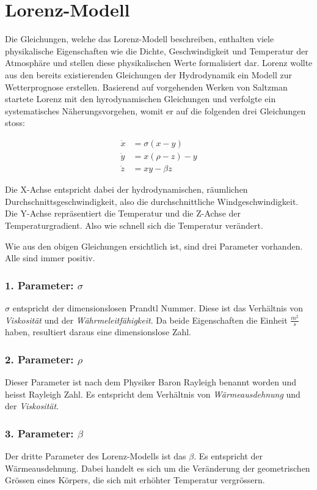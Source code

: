 

\section{Lorenz-Modell}
Die Gleichungen, welche das Lorenz-Modell beschreiben, enthalten viele physikalische Eigenschaften wie die Dichte, Geschwindigkeit und Temperatur der Atmosphäre und stellen diese physikalischen Werte formalisiert dar. Lorenz wollte aus den bereits existierenden Gleichungen der Hydrodynamik ein Modell zur Wetterprognose erstellen. Basierend auf vorgehenden Werken von Saltzman startete Lorenz mit den hyrodynamischen Gleichungen und verfolgte ein systematisches Näherungsvorgehen, womit er auf die folgenden drei Gleichungen stoss:

\begin{align}
\dot{x} &= \sigma(x - y)\\
\dot{y} &= x(\rho - z) - y\\
\dot{z} &= xy - \beta z
\end{align}

Die X-Achse entspricht dabei der hydrodynamischen, räumlichen Durchschnittsgeschwindigkeit, also die durchschnittliche Windgeschwindigkeit. Die Y-Achse repräsentiert die Temperatur und die Z-Achse der Temperaturgradient. Also wie schnell sich die Temperatur verändert. 

Wie aus den obigen Gleichungen ersichtlich ist, sind drei Parameter vorhanden. Alle sind immer positiv.

\subsubsection{1. Parameter: $\sigma$}
$\sigma$ entspricht der dimensionslosen Prandtl Nummer. Diese ist das Verhältnis von \textit{Viskosität} und der \textit{Währmeleitfähigkeit}. Da beide Eigenschaften die Einheit $\frac{m^2}{s}$ haben, resultiert daraus eine dimensionslose Zahl.

\subsubsection{2. Parameter: $\rho$}
Dieser Parameter ist nach dem Physiker Baron Rayleigh benannt worden und heisst Rayleigh Zahl. Es entspricht dem Verhältnis von \textit{Wärmeausdehnung} und der \textit{Viskosität}.

\subsubsection{3. Parameter: $\beta$}
Der dritte Parameter des Lorenz-Modells ist das $\beta$. Es entspricht der Wärmeausdehnung. Dabei handelt es sich um die Veränderung der geometrischen Grössen eines Körpers, die sich mit erhöhter Temperatur vergrössern.

